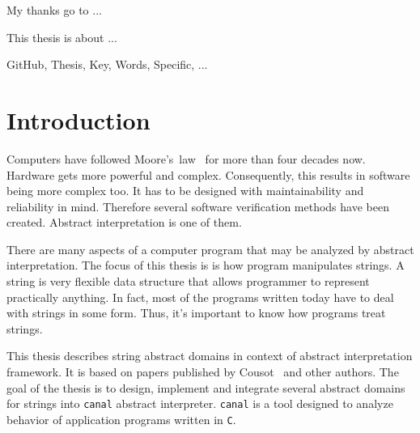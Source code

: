 \documentclass[12pt,final,oneside]{fithesis2}
\newcommand\emptypage{\newpage\null\thispagestyle{empty}\newpage}
\begin{document}
\FrontMatter
\ThesisTitlePage

\emptypage

\begin{ThesisDeclaration}
  \DeclarationText
  \AdvisorName
\end{ThesisDeclaration}

\begin{ThesisThanks}
My thanks go to ...
\end{ThesisThanks}

\begin{ThesisAbstract}
This thesis is about ...
\end{ThesisAbstract}

\begin{ThesisKeyWords}
GitHub, Thesis, Key, Words, Specific, ...
\end{ThesisKeyWords}

\MainMatter

\tableofcontents


\chapter{Introduction}

Computers have followed Moore's~law~\cite{Moore65-1} for more than
four decades now. Hardware gets more powerful and complex. Consequently,
this results in software being more complex too. It has to be designed
with maintainability and reliability in mind. Therefore several software
verification methods have been created. Abstract interpretation is one
of them.

There are many aspects of a computer program that may be analyzed by
abstract interpretation. The focus of this thesis is
is how program manipulates strings. A string is very flexible data
structure that allows programmer to represent practically anything.
In fact, most of the programs written today have to deal with strings
in some form. Thus, it's important to know how programs treat strings.

This thesis describes string abstract domains in context of abstract
interpretation framework. It is based on papers published
by Cousot~\cite{CousotCousot77-1} and other authors. The goal of the thesis
is to design, implement and integrate several abstract domains for strings
into \texttt{canal} abstract interpreter. \texttt{canal} is a tool designed
to analyze behavior of application programs written in \texttt{C}.
\end{document}

